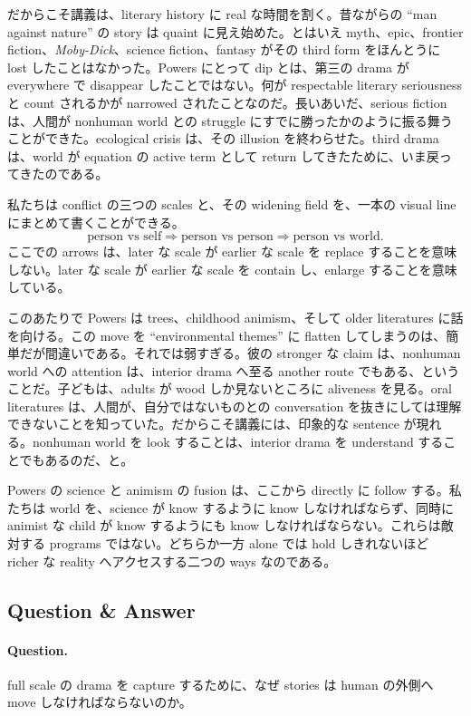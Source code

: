 だからこそ講義は、literary history に real な時間を割く。昔ながらの ``man against nature'' の story は quaint に見え始めた。とはいえ myth、epic、frontier fiction、\emph{Moby-Dick}、science fiction、fantasy がその third form をほんとうに lost したことはなかった。Powers にとって dip とは、第三の drama が everywhere で disappear したことではない。何が respectable literary seriousness と count されるかが narrowed されたことなのだ。長いあいだ、serious fiction は、人間が nonhuman world との struggle にすでに勝ったかのように振る舞うことができた。ecological crisis は、その illusion を終わらせた。third drama は、world が equation の active term として return してきたために、いま戻ってきたのである。

私たちは conflict の三つの scales と、その widening field を、一本の visual line にまとめて書くことができる。
\begin{equation}
\text{person vs self} \Rightarrow \text{person vs person} \Rightarrow \text{person vs world}.
\end{equation}
ここでの arrows は、later な scale が earlier な scale を replace することを意味しない。later な scale が earlier な scale を contain し、enlarge することを意味している。

このあたりで Powers は trees、childhood animism、そして older literatures に話を向ける。この move を ``environmental themes'' に flatten してしまうのは、簡単だが間違いである。それでは弱すぎる。彼の stronger な claim は、nonhuman world への attention は、interior drama へ至る another route でもある、ということだ。子どもは、adults が wood しか見ないところに aliveness を見る。oral literatures は、人間が、自分ではないものとの conversation を抜きにしては理解できないことを知っていた。だからこそ講義には、印象的な sentence が現れる。nonhuman world を look することは、interior drama を understand することでもあるのだ、と。

Powers の science と animism の fusion は、ここから directly に follow する。私たちは world を、science が know するように know しなければならず、同時に animist な child が know するようにも know しなければならない。これらは敵対する programs ではない。どちらか一方 alone では hold しきれないほど richer な reality へアクセスする二つの ways なのである。

\subsection{Question \& Answer}

\paragraph{Question.} full scale の drama を capture するために、なぜ stories は human の外側へ move しなければならないのか。

